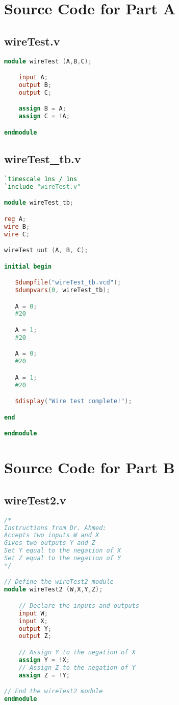 \documentclass[a4paper,12pt]{article}
\begin{document}
\section*{Source Code for Part A}
\subsection*{wireTest.v}
\begin{lstlisting}[language=Verilog, caption=wireTest.v]
module wireTest (A,B,C);

    input A;
    output B;
    output C;

    assign B = A;
    assign C = !A;

endmodule
\end{lstlisting}

\subsection*{wireTest\_tb.v}
\begin{lstlisting}[language=Verilog, caption=wireTest_tb.v]
`timescale 1ns / 1ns
`include "wireTest.v"

module wireTest_tb;

reg A;
wire B;
wire C;

wireTest uut (A, B, C);

initial begin

   $dumpfile("wireTest_tb.vcd");
   $dumpvars(0, wireTest_tb);

   A = 0;
   #20

   A = 1;
   #20

   A = 0;
   #20

   A = 1;
   #20

   $display("Wire test complete!");

end

endmodule
\end{lstlisting}

\section*{Source Code for Part B}
\subsection*{wireTest2.v}
\begin{lstlisting}[language=Verilog, caption=wireTest2.v]
/*
Instructions from Dr. Ahmed:
Accepts two inputs W and X
Gives two outputs Y and Z
Set Y equal to the negation of X
Set Z equal to the negation of Y
*/

// Define the wireTest2 module
module wireTest2 (W,X,Y,Z);

    // Declare the inputs and outputs
    input W;
    input X;
    output Y;
    output Z;

    // Assign Y to the negation of X
    assign Y = !X;
    // Assign Z to the negation of Y
    assign Z = !Y;

// End the wireTest2 module
endmodule
\end{lstlisting}
\end{document}
